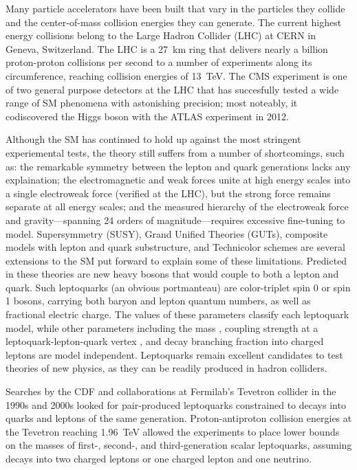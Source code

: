 Many particle accelerators have been built that vary in the particles they collide and the center-of-mass collision energies they can generate. The current highest energy collisions belong to the Large Hadron Collider (LHC) at CERN in Geneva, Switzerland. The LHC is a \SI{27}{\km} ring that delivers nearly a billion proton-proton collisions per second to a number of experiments along its circumference, reaching collision energies of \SI{13}{\TeV}. The CMS experiment is one of two general purpose detectors at the LHC that has succesfully tested a wide range of SM phenomena with astonishing precision; most noteably, it codiscovered the Higgs boson with the ATLAS experiment in 2012.

Although the SM has continued to hold up against the most stringent experiemental tests, the theory still suffers from a number of shortcomings, such as: the remarkable symmetry between the lepton and quark generations lacks any explaination; the electromagnetic and weak forces unite at high energy scales into a single electroweak force (verified at the LHC), but the strong force remains separate at all energy scales; and the measured hierarchy of the electroweak force and gravity---spanning 24 orders of magnitude---requires excessive fine-tuning to model. Supersymmetry (SUSY), Grand Unified Theories (GUTs), composite models with lepton and quark substructure, and Technicolor schemes are several extensions to the SM put forward to explain some of these limitations. Predicted in these theories are new heavy bosons that would couple to both a lepton and quark. Such leptoquarks (an obvious portmanteau) are color-triplet spin 0 or spin 1 bosons, carrying both baryon and lepton quantum numbers, as well as fractional electric charge. The values of these parameters classify each leptoquark model, while other parameters including the mass \MLQ, coupling strength at a leptoquark-lepton-quark vertex \lambdaLQ, and decay branching fraction into charged leptons \bfu are model independent. Leptoquarks remain excellent candidates to test theories of new physics, as they can be readily produced in hadron colliders.

Searches by the CDF and \DZERO collaborations at Fermilab's Tevetron collider in the 1990s and 2000s looked for pair-produced leptoquarks constrained to decays into quarks and leptons of the same generation. Proton-antiproton collision energies at the Tevetron reaching \SI{1.96}{\TeV} allowed the experiments to place lower bounds on the masses of first-, second-, and third-generation scalar leptoquarks, assuming decays into two charged leptons or one charged lepton and one neutrino.

